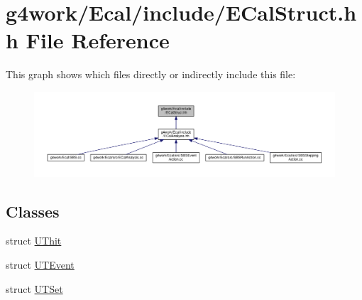 \hypertarget{_e_cal_struct_8hh}{\section{g4work/\-Ecal/include/\-E\-Cal\-Struct.hh File Reference}
\label{_e_cal_struct_8hh}
}
This graph shows which files directly or indirectly include this file\-:\nopagebreak
\begin{figure}[H]
\begin{center}
\leavevmode
\includegraphics[width=350pt]{_e_cal_struct_8hh__dep__incl}
\end{center}
\end{figure}
\subsection*{Classes}
\begin{DoxyCompactItemize}
\item 
struct \hyperlink{struct_u_thit}{U\-Thit}
\item 
struct \hyperlink{struct_u_t_event}{U\-T\-Event}
\item 
struct \hyperlink{struct_u_t_set}{U\-T\-Set}
\end{DoxyCompactItemize}
